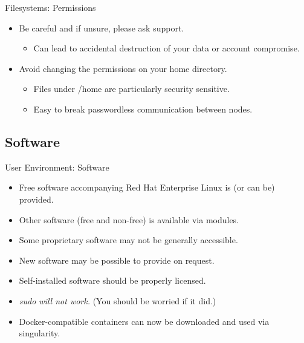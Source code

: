 \begin{frame}{Filesystems: Permissions}
\begin{itemize}
\item{\color{red}Be careful and if unsure, please ask support.}
\begin{itemize}
\item{Can lead to \alert{accidental destruction} of your data or \alert{account compromise}.}
\end{itemize}
\item{Avoid changing the permissions on your home directory.}
\begin{itemize}
\item{Files under /home are particularly security sensitive.}
\item{Easy to break passwordless communication between nodes.}
\end{itemize}
\end{itemize}
\end{frame}

\subsection{Software}
\begin{frame}{User Environment: Software}
\begin{itemize}
\item{Free software accompanying \alert{Red Hat Enterprise Linux} is (or can be) provided.}
\item{Other software (free and non-free) is available via \alert{modules}.}
\item{Some proprietary software may not be generally accessible.}
\item{New software may be possible to provide on request.}
\item{\alert{Self-installed software should be properly licensed.}}
  \pause
\item{\color{red}\emph{sudo will not work.}\/ (You should be worried if it did.)}
  \pause
\item{Docker-compatible containers can now be downloaded and used via \alert{singularity}.}
\end{itemize}
\end{frame}

